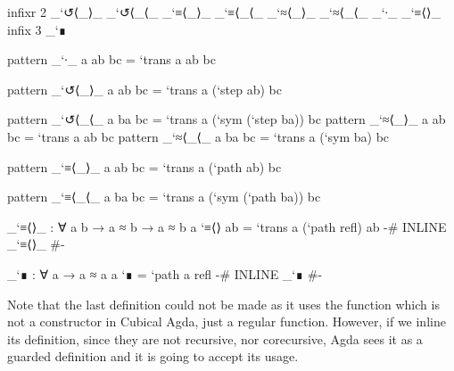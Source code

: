 \begin{AgdaSuppressSpace}
\begin{code}[hide]
infixr 2 _`↺⟨_⟩_ _`↺⟨_⟨_ _`≡⟨_⟩_ _`≡⟨_⟨_ _`≈⟨_⟩_ _`≈⟨_⟨_ _`∙_ _`≡⟨⟩_
infix  3 _`∎

pattern _`∙_  {a} ab bc = `trans {a} ab bc
\end{code}
\begin{code}
pattern _`↺⟨_⟩_ a ab bc = `trans {a} (`step ab) bc
\end{code}
\begin{code}[hide]
pattern _`↺⟨_⟨_ a ba bc = `trans {a} (`sym (`step ba)) bc
pattern _`≈⟨_⟩_ a ab bc = `trans {a} ab bc
pattern _`≈⟨_⟨_ a ba bc = `trans {a} (`sym ba) bc
\end{code}
\begin{code}
pattern _`≡⟨_⟩_ a ab bc = `trans {a} (`path ab) bc
\end{code}
\begin{code}[hide]
pattern _`≡⟨_⟨_ a ba bc = `trans {a} (`sym (`path ba)) bc
\end{code}
\end{AgdaSuppressSpace}
\begin{code}[hide]
_`≡⟨⟩_ : ∀ a {b} → a ≈ b → a ≈ b
a `≡⟨⟩ ab = `trans {a} (`path refl) ab
{-# INLINE _`≡⟨⟩_ #-}
\end{code}
\begin{code}
_`∎ : ∀ a → a ≈ a
a `∎ = `path {a} refl
{-# INLINE _`∎ #-}
\end{code}

Note that the last definition could not be made 
as it uses the  function which is not a constructor
in Cubical Agda, just a regular function. However, if we inline its definition,
since they are not recursive, nor corecursive, Agda sees it as a guarded definition
and it is going to accept its usage.
